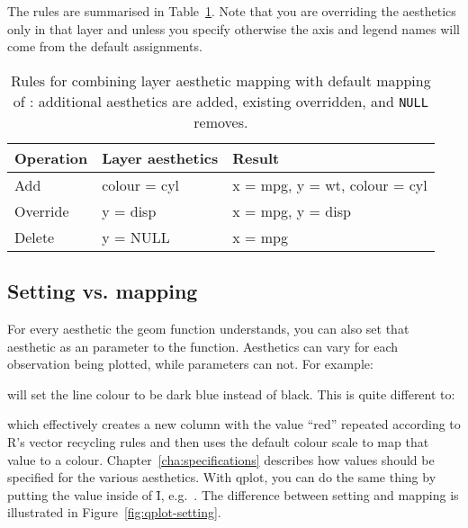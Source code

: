 % 


\noindent The rules are summarised in Table~\ref{tbl:aes-override}.  Note that you are overriding the aesthetics only in that layer and unless you specify otherwise the axis and legend names will come from the default assignments. 

\begin{table}
  \begin{center}
  \begin{tabular}{lll}
    \toprule
    Operation & Layer aesthetics  & Result \\
    \midrule
    Add       & colour = cyl & x = mpg, y = wt, colour = cyl \\
    Override  & y = disp     & x = mpg, y = disp \\
    Delete    & y = NULL     & x = mpg \\
    \bottomrule
  \end{tabular}
  \end{center}
  \caption{Rules for combining layer aesthetic mapping with default mapping of :  additional aesthetics are added, existing overridden, and {\tt NULL} removes.}
  \label{tbl:aes-override}
\end{table}


\subsection{Setting vs. mapping}
\label{sub:setting-mapping}

For every aesthetic the geom function understands, you can also set that aesthetic as an parameter to the function.  Aesthetics can vary for each observation being plotted, while parameters can not.  For example:

% 


\noindent will set the line colour to be dark blue instead of black.  This is quite different to:

% 


\noindent which effectively creates a new column with the value ``red'' repeated according to R's vector recycling rules and then uses the default colour scale to map that value to a colour. Chapter~\ref{cha:specifications} describes how values should be specified for the various aesthetics.  With qplot, you can do the same thing by putting the value inside of \f{I}, e.g.\ .  The difference between setting and mapping is illustrated in Figure~\ref{fig:qplot-setting}.  


